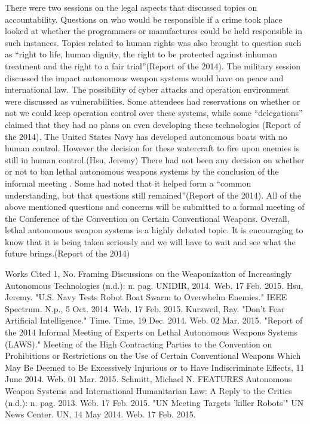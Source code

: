 \documentclass{report}
\begin{document}
There were two sessions on the legal aspects that discussed topics on accountability. Questions on who would be responsible if a crime took place looked at whether the programmers or manufactures could be held responsible in such instances. Topics related to human rights was also brought to question such as “right to life, human dignity, the right to be protected against inhuman treatment and the right to a fair trial”(Report of the 2014).
The military session discussed the impact autonomous weapon systems would have on peace and international law. The possibility of cyber attacks and operation environment were discussed as vulnerabilities. Some attendees had reservations on whether or not we could keep operation control over these systems, while some “delegations” claimed that they had no plans on even developing these technologies (Report of the 2014). The United States Navy has developed autonomous boats with no human control. However the decision for these watercraft to fire upon enemies is still in human control.(Hsu, Jeremy) 
There had not been any decision on whether or not to ban lethal autonomous weapons systems by the conclusion of the informal meeting . Some had noted that it helped form a “common understanding, but that questions still remained”(Report of the 2014). All of the above mentioned questions and concerns will be submitted to a formal meeting of the Conference of the Convention on Certain Conventional Weapons. Overall, lethal autonomous weapon systems is a highly debated topic. It is encouraging to know that it is being taken seriously and we will have to wait and see what the future brings.(Report of the 2014)






Works Cited
1, No. Framing Discussions on the Weaponization of Increasingly Autonomous Technologies (n.d.): n. pag. UNIDIR, 2014. Web. 17 Feb. 2015.
Hsu, Jeremy. "U.S. Navy Tests Robot Boat Swarm to Overwhelm Enemies." IEEE Spectrum. N.p., 5 Oct. 2014. Web. 17 Feb. 2015.
Kurzweil, Ray. "Don't Fear Artificial Intelligence." Time. Time, 19 Dec. 2014. Web. 02 Mar. 2015.
"Report of the 2014 Informal Meeting of Experts on Lethal Autonomous Weapons Systems (LAWS)." Meeting of the High Contracting Parties to the Convention on Prohibitions or Restrictions on the Use of Certain Conventional Weapons Which May Be Deemed to Be Excessively Injurious or to Have Indiscriminate Effects, 11 June 2014. Web. 01 Mar. 2015.
Schmitt, Michael N. FEATURES Autonomous Weapon Systems and International Humanitarian Law: A Reply to the Critics (n.d.): n. pag. 2013. Web. 17 Feb. 2015.
"UN Meeting Targets 'killer Robots'" UN News Center. UN, 14 May 2014. Web. 17 Feb. 2015.
\end{document}
